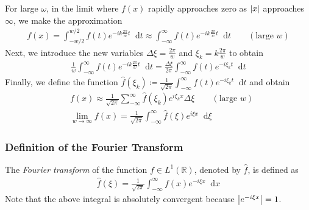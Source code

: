 \documentclass[11pt, a4paper]{article}
\newcommand{\diff}{\mathop{}\!\mathrm{d}} %
\newcommand{\R}{\mathbb{R}} %
\begin{document}
For large $ \omega $, in the limit where $ f(x) $ rapidly approaches zero as $ \abs{x} $ approaches $ \infty $, we make the approximation
\begin{align*}
	f(x) = \int_{-w/2}^{w/2} f(t)  e^{-ik\frac{2\pi}{w}t} \diff t \approx \int_{-\infty}^{\infty} f(t)  e^{-ik\frac{2\pi}{w}t} \diff t \qquad (\text{large } w)
\end{align*}
Next, we introduce the new variables $ \Delta \xi = \frac{2\pi}{w} $ and $ \xi_k = k \frac{2\pi}{w} $ to obtain
\begin{align*}
	\frac{1}{w} \int_{-\infty}^{\infty} f(t)  e^{-ik\frac{2\pi}{w}t} \diff t  = \frac{\Delta \xi}{2\pi} \int_{-\infty}^{\infty} f(t)  e^{-i \xi_k t} \diff t 
\end{align*}
Finally, we define the function $ \displaystyle{\widehat{f}(\xi_k) \coloneqq \frac{1}{\sqrt{2\pi}} \int_{-\infty}^{\infty} f(t)  e^{-i \xi_k t} \diff t } $
and obtain
\begin{align*}
	&f(x) \approx \frac{1}{\sqrt{2\pi}} \sum_{-\infty}^{\infty} \widehat{f}(\xi_k) e^{i\xi_k x} \Delta \xi \qquad (\text{large } w) \\
	&\lim_{w \to \infty} f(x) = \frac{1}{\sqrt{2\pi}} \int_{-\infty}^{\infty} \widehat{f}(\xi) e^{i\xi x} \diff \xi 
\end{align*}

\subsubsection{Definition of the Fourier Transform}
The \textit{Fourier transform} of the function $ f \in L^{1}(\R) $, denoted by $ \widehat{f} $, is defined as
\begin{align*}
	\widehat{f}(\xi) = \frac{1}{\sqrt{2\pi}} \int_{-\infty}^{\infty} f(x)e^{-i\xi x} \diff x
\end{align*}
Note that the above integral is absolutely convergent because $ \abs{e^{-i\xi x}} = 1 $.
\end{document}
